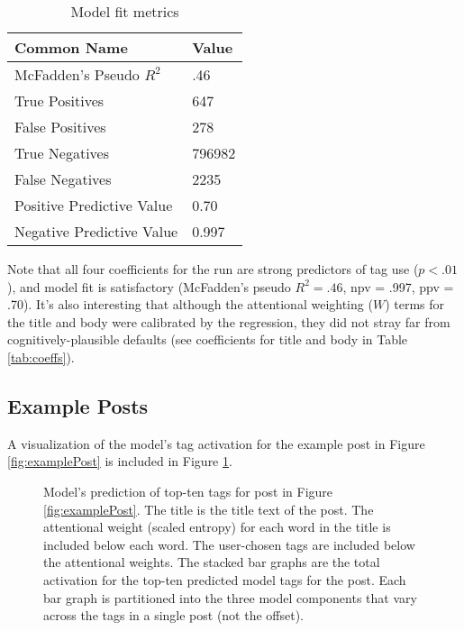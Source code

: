 \documentclass[10pt,letterpaper]{article}
\begin{document}
\renewcommand{\arraystretch}{1}
\renewcommand{\tabcolsep}{3mm}
\begin{table}[!ht]
  \begin{center}
    \caption{Model fit metrics}
    \label{tab:fits}
    \vskip 0.12in
    \begin{tabular}{ll}
      \hline
      Common Name &  Value	\\
      \hline
      McFadden's Pseudo $R_{}^{2}$ &	.46 \\
      True Positives &			647 \\
      False Positives &			278 \\
      True Negatives &			\num{796982} \\
      False Negatives &			\num{2235} \\
      Positive Predictive Value &	0.70 \\
      Negative Predictive Value &	0.997 \\
      \hline
    \end{tabular}
  \end{center}
\end{table}

Note that all four coefficients for the run are strong predictors of tag use ($p<.01$), and model fit is satisfactory (McFadden's pseudo $R_{}^{2}=.46$, npv = .997, ppv = .70).
It's also interesting that although the attentional weighting ($W$) terms for the title and body were calibrated by the regression, they did not stray far from cognitively-plausible defaults
(see coefficients for title and body in Table \ref{tab:coeffs}).

\subsection{Example Posts}

A visualization of the model's tag activation for the example post in Figure \ref{fig:examplePost} is included in Figure \ref{fig:modelPost}.

\begin{figure}[ht]
  \centering
  \caption{
    Model's prediction of top-ten tags for post in Figure \ref{fig:examplePost}.
    The title is the title text of the post.
    The attentional weight (scaled entropy) for each word in the title is included below each word.
    The user-chosen tags are included below the attentional weights.
    The stacked bar graphs are the total activation for the top-ten predicted model tags for the post.
    Each bar graph is partitioned into the three model components that vary across the tags in a single post (not the offset).
}
  \label{fig:modelPost}
\end{figure}
\end{document}
